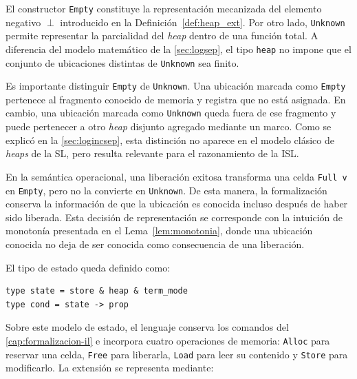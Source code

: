 \documentclass[a4paper,	11pt]{report}
\newif\ifdraft\drafttrue
\newcommand{\comm}[3]{\ifdraft{{\color{#1}[#2: #3]}}\fi}
\newcommand{\guido}[1]{\comm{blue}{Guido}{#1}}
\begin{document}
El constructor \lstinline|Empty| constituye la representación mecanizada del elemento negativo $\perp$ introducido en la Definición~\ref{def:heap_ext}.
Por otro lado,
\lstinline|Unknown| permite representar la parcialidad del \emph{heap} dentro de una función total.
A diferencia del modelo matemático de la \autoref{sec:logsep},
el tipo \lstinline|heap| no impone que el conjunto de ubicaciones distintas de \lstinline|Unknown| sea finito.

Es importante distinguir \lstinline|Empty| de \lstinline|Unknown|. 
Una ubicación marcada como \lstinline|Empty| pertenece al fragmento conocido de memoria y registra que no está asignada.
En cambio,
una ubicación marcada como \lstinline|Unknown| queda fuera de ese fragmento
y puede pertenecer a otro \emph{heap} disjunto agregado mediante un marco.
Como se explicó en la \autoref{sec:logincsep},
esta distinción no aparece en el modelo clásico de \emph{heaps} de la SL,
pero resulta relevante para el razonamiento de la ISL.

En la semántica operacional,
una liberación exitosa transforma una celda \lstinline|Full v| en \lstinline|Empty|,
pero no la convierte en \lstinline|Unknown|.
De esta manera,
la formalización conserva la información de que la ubicación es conocida incluso después de haber sido liberada.
Esta decisión de representación se corresponde con la intuición de monotonía presentada en el Lema~\ref{lem:monotonia},
donde una ubicación conocida no deja de ser conocida como consecuencia de una liberación.

El tipo de estado queda definido como:

\begin{lstlisting}
type state = store & heap & term_mode
type cond = state -> prop
\end{lstlisting}


Sobre este modelo de estado,
el lenguaje conserva los comandos del \autoref{cap:formalizacion-il} e incorpora cuatro operaciones de memoria:
\lstinline|Alloc| para reservar una celda,
\lstinline|Free| para liberarla,
\lstinline|Load| para leer su contenido y \lstinline|Store| para modificarlo.
La extensión se representa mediante:
\end{document}
